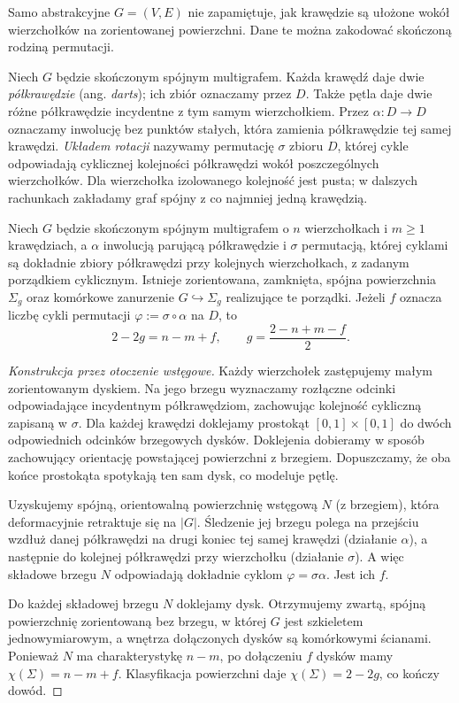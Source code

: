 Samo abstrakcyjne $G=(V,E)$ nie zapamiętuje, jak krawędzie
są ułożone wokół wierzchołków na zorientowanej powierzchni.
Dane te można zakodować skończoną rodziną permutacji.

\begin{definicja}
Niech $G$ będzie skończonym spójnym multigrafem. Każda
krawędź daje dwie \emph{półkrawędzie} (ang. \emph{darts});
ich zbiór oznaczamy przez $D$. Także pętla daje dwie
różne półkrawędzie incydentne z tym samym wierzchołkiem.
Przez $\alpha:D\to D$ oznaczamy inwolucję bez punktów stałych,
która zamienia półkrawędzie tej samej krawędzi.
\emph{Układem rotacji} nazywamy permutację $\sigma$ zbioru $D$,
której cykle odpowiadają cyklicznej kolejności półkrawędzi
wokół poszczególnych wierzchołków. Dla wierzchołka
izolowanego kolejność jest pusta; w dalszych rachunkach
zakładamy graf spójny z co najmniej jedną krawędzią.
\end{definicja}

\begin{twierdzenie}
\label{thm:tg-rotation-genus}
Niech $G$ będzie skończonym spójnym multigrafem o $n$
wierzchołkach i $m\ge1$ krawędziach, a $\alpha$ inwolucją parującą półkrawędzie i $\sigma$
permutacją, której cyklami są dokładnie zbiory półkrawędzi
przy kolejnych wierzchołkach, z zadanym porządkiem cyklicznym. Istnieje zorientowana, zamknięta,
spójna powierzchnia $\Sigma_g$ oraz komórkowe zanurzenie
$G\hookrightarrow\Sigma_g$ realizujące te porządki.
Jeżeli $f$ oznacza liczbę cykli permutacji
$\varphi:=\sigma\circ\alpha$ na $D$, to
\[
 2-2g=n-m+f,
 \qquad g=\frac{2-n+m-f}{2}.
\]
\end{twierdzenie}

\begin{proof}[Konstrukcja przez otoczenie wstęgowe]
Każdy wierzchołek zastępujemy małym zorientowanym
dyskiem. Na jego brzegu wyznaczamy rozłączne odcinki
odpowiadające incydentnym półkrawędziom, zachowując
kolejność cykliczną zapisaną w $\sigma$.
Dla każdej krawędzi doklejamy prostokąt
$[0,1]\times[0,1]$ do dwóch odpowiednich odcinków
brzegowych dysków. Doklejenia dobieramy w sposób
zachowujący orientację powstającej powierzchni z brzegiem.
Dopuszczamy, że oba końce prostokąta spotykają ten sam dysk,
co modeluje pętlę.

Uzyskujemy spójną, orientowalną powierzchnię wstęgową $N$
(z brzegiem), która deformacyjnie retraktuje się na $|G|$.
Śledzenie jej brzegu polega na przejściu wzdłuż danej
półkrawędzi na drugi koniec tej samej krawędzi (działanie
$\alpha$), a następnie do kolejnej półkrawędzi przy
wierzchołku (działanie $\sigma$). A więc składowe brzegu
$N$ odpowiadają dokładnie cyklom $\varphi=\sigma\alpha$.
Jest ich $f$.

Do każdej składowej brzegu $N$ doklejamy dysk.
Otrzymujemy zwartą, spójną powierzchnię zorientowaną
bez brzegu, w której $G$ jest szkieletem jednowymiarowym,
a wnętrza dołączonych dysków są komórkowymi ścianami.
Ponieważ $N$ ma charakterystykę $n-m$, po dołączeniu
$f$ dysków mamy $\chi(\Sigma)=n-m+f$.
Klasyfikacja powierzchni daje $\chi(\Sigma)=2-2g$,
co kończy dowód.
\end{proof}

